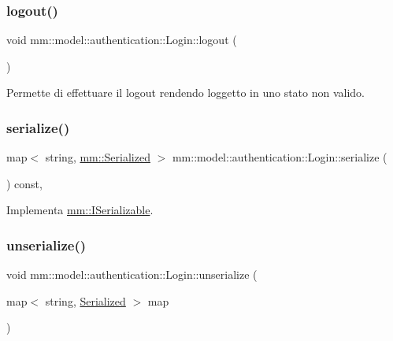 \subsubsection{\texorpdfstring{logout()}{logout()}}
{\footnotesize\ttfamily void mm\+::model\+::authentication\+::\+Login\+::logout (\begin{DoxyParamCaption}{ }\end{DoxyParamCaption})}



Permette di effettuare il logout rendendo l\textquotesingle{}oggetto in uno stato non valido. 

\mbox{\label{structmm_1_1model_1_1authentication_1_1_login_a69ec1a769ef1659b8ed39d5e23c24333}} 
\subsubsection{\texorpdfstring{serialize()}{serialize()}}
{\footnotesize\ttfamily map$<$ string, \mbox{\hyperlink{structmm_1_1_serialized}{mm\+::\+Serialized}} $>$ mm\+::model\+::authentication\+::\+Login\+::serialize (\begin{DoxyParamCaption}{ }\end{DoxyParamCaption}) const\hspace{0.3cm}{\ttfamily [override]}, {\ttfamily [virtual]}}



Implementa \mbox{\hyperlink{classmm_1_1_i_serializable_a20a59e2324c8dbf6fefe4d11ae89d0fb}{mm\+::\+I\+Serializable}}.

\mbox{\label{structmm_1_1model_1_1authentication_1_1_login_ac2429ce08624b0c425feced836b77d62}} 
\subsubsection{\texorpdfstring{unserialize()}{unserialize()}}
{\footnotesize\ttfamily void mm\+::model\+::authentication\+::\+Login\+::unserialize (\begin{DoxyParamCaption}\item[{map$<$ string, \mbox{\hyperlink{structmm_1_1_serialized}{Serialized}} $>$}]{map }\end{DoxyParamCaption})\hspace{0.3cm}{\ttfamily [override]}}



